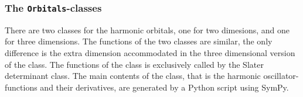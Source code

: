 	\subsubsection{The {\tt Orbitals}-classes}
		There are two classes for the harmonic orbitals, one for two dimesions, and one for three dimensions. The functions of the two classes are similar, the only difference is the extra dimension accommodated in the three dimensional version of the class. The functions of the class is exclusively called by the Slater determinant class. The main contents of the class, that is the harmonic oscillator-functions and their derivatives, are generated by a Python script using SymPy. 


